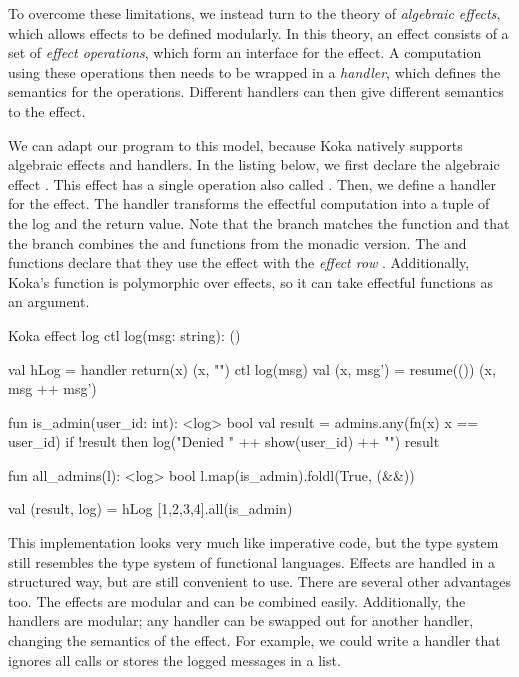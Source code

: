To overcome these limitations, we instead turn to the theory of \emph{algebraic effects}, which allows effects to be defined modularly. In this theory, an effect consists of a set of \emph{effect operations}, which form an interface for the effect. A computation using these operations then needs to be wrapped in a \emph{handler}, which defines the semantics for the operations. Different handlers can then give different semantics to the effect.

We can adapt our program to this model, because Koka natively supports algebraic effects and handlers. In the listing below, we first declare the algebraic effect . This effect has a single operation also called . Then, we define a handler  for the  effect. The handler transforms the effectful computation into a tuple of the log and the return value. Note that the  branch matches the  function and that the  branch combines the  and  functions from the monadic version. The  and  functions declare that they use the  effect with the \emph{effect row} . Additionally, Koka's  function is polymorphic over effects, so it can take effectful functions as an argument.

\begin{lst}{Koka}
effect log
  ctl log(msg: string): ()
  
val hLog = handler
  return(x) (x, "")
  ctl log(msg)
    val (x, msg') = resume(())
    (x, msg ++ msg')
  
fun is_admin(user_id: int): <log> bool
  val result = admins.any(fn(x) x == user_id)
  if !result then
    log("Denied " ++ show(user_id) ++ "\n")
  result
 
fun all_admins(l): <log> bool
  l.map(is_admin).foldl(True, (&&))
  
val (result, log) = hLog { [1,2,3,4].all(is_admin) }
\end{lst}
%
This implementation looks very much like imperative code, but the type system still resembles the type system of functional languages. Effects are handled in a structured way, but are still convenient to use. There are several other advantages too. The effects are modular and can be combined easily. Additionally, the handlers are modular; any handler can be swapped out for another handler, changing the semantics of the effect. For example, we could write a handler that ignores all  calls or stores the logged messages in a list.

